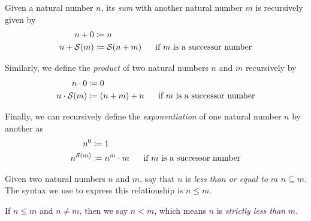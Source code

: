 %     

\begin{definition}
    Given a natural number \(n\),
    its \emph{sum} with another natural number \(m\) is recursively given by
    \begin{align*}
        n + 0 &\defn n\\
        n + \successor{m} &\defn \successor{n + m}~~~~\text{ if } m \text{ is a successor number}
    \end{align*}

    Similarly, we define the \emph{product} of two natural numbers \(n\) and \(m\) recursively by
    \begin{align*}
        n \cdot 0 &\defn 0\\
        n \cdot \successor{m} &\defn \pn*{n + m} + n~~~~\text{ if } m \text{ is a successor number}
    \end{align*}

    Finally, we can recursively define the \emph{exponentiation} of one natural number \(n\) by another as
    \begin{align*}
        n^{0} &\defn 1\\
        n^{\successor{m}} &\defn n^{m} \cdot m~~~~\text{ if } m \text{ is a successor number}
    \end{align*}
\end{definition}

%     

\begin{definition}
    Given two natural numbers \(n\) and \(m\),
    say that \(n\) is \emph{less than or equal to} \(m\) \iffbydefn \(n \subseteq m\).
    The syntax we use to express this relationship is \(n \leq m\).

    If \(n \leq m\) and \(n \neq m\), then we say \(n < m\),
    which means \(n\) is \emph{strictly less than} \(m\).
\end{definition}

